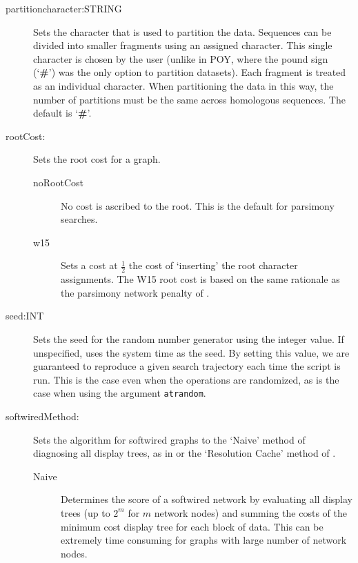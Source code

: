 \begin{description}
		\item[partitioncharacter:STRING] Sets the character that is used to partition the 
		data. Sequences can be divided into smaller fragments using an assigned character. 
		This single character is chosen by the user (unlike in POY, where the pound sign 
		(`\textbf{\#}') was the only option to partition datasets). Each fragment is treated as an 
		individual character. When partitioning the data in this way, the number of partitions 
		must be the same across homologous sequences. The default is `\textbf{\#}'.


		\item[rootCost:] Sets the root cost for a graph. 	
				
		\begin{description}
			
			\item[noRootCost]  No cost is ascribed to the root. This is the default for parsimony searches.
			
			\item[w15] Sets a cost at $\frac{1}{2}$ the cost of `inserting' the root character 
			assignments. The W15 root cost is based on the same rationale as the parsimony 
			network penalty of  \cite{Wheeler2015}.

		\end{description}
			 
		 \item[seed:INT] Sets the seed for the random number generator using the integer
		 value. If unspecified, \phyg uses the system time as the seed. By setting this value, 
		 we are guaranteed to reproduce a given search trajectory each time the script is run. 
		 This is the case even when the operations are randomized, as is the case when using 
		 the argument \texttt{atrandom}.
			 
		 \item[softwiredMethod:] Sets the algorithm for softwired graphs to the 
		 `Naive' method of diagnosing all display trees, as in \cite{Wheeler2015} or
		 the `Resolution Cache' method of \cite{WheelerandWashburn2023}.
		 
		\begin{description}
			
			\item[Naive] Determines the score of a softwired network by evaluating all display 
			trees (up to $2^m$ for $m$ network nodes) and summing the costs of the minimum 
			cost display tree for each block of data. This can be extremely time consuming for 
			graphs with large number of network nodes.
			

\end{description}
\end{description}
